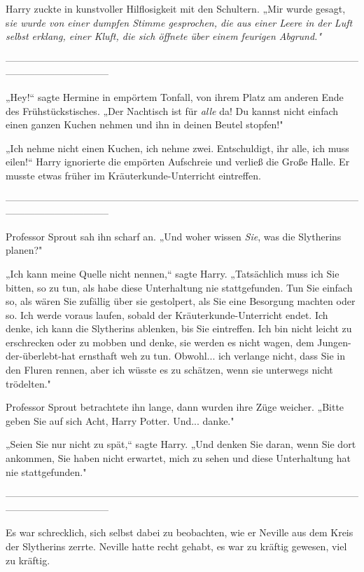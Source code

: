 {Harry zuckte in kunstvoller Hilflosigkeit mit den Schultern. „Mir wurde gesagt, s\emph{ie wurde von einer dumpfen Stimme gesprochen, die aus einer Leere in der Luft selbst erklang, einer Kluft, die sich öffnete über einem feurigen Abgrund."}

--------------------------------------------------------------------------------------------------------------------------------------------

\hfill\break „Hey!“ sagte Hermine in empörtem Tonfall, von ihrem Platz am anderen Ende des Frühstückstisches. „Der Nachtisch ist für \emph{alle} da! Du kannst nicht einfach einen ganzen Kuchen nehmen und ihn in deinen Beutel stopfen!"

„Ich nehme nicht einen Kuchen, ich nehme zwei. Entschuldigt, ihr alle, ich muss eilen!“ Harry ignorierte die empörten Aufschreie und verließ die Große Halle. Er musste etwas früher im Kräuterkunde-Unterricht eintreffen.

--------------------------------------------------------------------------------------------------------------------------------------------

\hfill\break Professor Sprout sah ihn scharf an. „Und woher wissen \emph{Sie}, was die Slytherins planen?"

„Ich kann meine Quelle nicht nennen,“ sagte Harry. „Tatsächlich muss ich Sie bitten, so zu tun, als habe diese Unterhaltung nie stattgefunden. Tun Sie einfach so, als wären Sie zufällig über sie gestolpert, als Sie eine Besorgung machten oder so. Ich werde voraus laufen, sobald der Kräuterkunde-Unterricht endet. Ich denke, ich kann die Slytherins ablenken, bis Sie eintreffen. Ich bin nicht leicht zu erschrecken oder zu mobben und denke, sie werden es nicht wagen, dem Jungen-der-überlebt-hat ernsthaft weh zu tun. Obwohl... ich verlange nicht, dass Sie in den Fluren rennen, aber ich wüsste es zu schätzen, wenn sie unterwegs nicht trödelten."

Professor Sprout betrachtete ihn lange, dann wurden ihre Züge weicher. „Bitte geben Sie auf sich Acht, Harry Potter. Und... danke."

„Seien Sie nur nicht zu spät,“ sagte Harry. „Und denken Sie daran, wenn Sie dort ankommen, Sie haben nicht erwartet, mich zu sehen und diese Unterhaltung hat nie stattgefunden."

--------------------------------------------------------------------------------------------------------------------------------------------

\hfill\break Es war schrecklich, sich selbst dabei zu beobachten, wie er Neville aus dem Kreis der Slytherins zerrte. Neville hatte recht gehabt, es war zu kräftig gewesen, viel zu kräftig.

}
